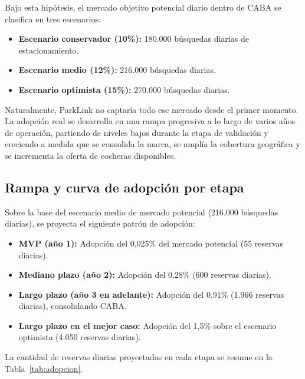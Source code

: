 Bajo esta hipótesis, el mercado objetivo potencial diario dentro de CABA se clasifica en tres escenarios:
\begin{itemize}
    \item \textbf{Escenario conservador (10\%):} 180.000 búsquedas diarias de estacionamiento.
    \item \textbf{Escenario medio (12\%):} 216.000 búsquedas diarias.
    \item \textbf{Escenario optimista (15\%):} 270.000 búsquedas diarias.
\end{itemize}

Naturalmente, ParkLink no captaría todo ese mercado desde el primer momento. La adopción real se desarrolla en una rampa progresiva a lo largo de varios años de operación, partiendo de niveles bajos durante la etapa de validación y creciendo a medida que se consolida la marca, se amplía la cobertura geográfica y se incrementa la oferta de cocheras disponibles.

\subsection{Rampa y curva de adopción por etapa}

Sobre la base del escenario medio de mercado potencial (216.000 búsquedas diarias), se proyecta el siguiente patrón de adopción:

\begin{itemize}
    \item \textbf{MVP (año 1):} Adopción del 0,025\% del mercado potencial (55 reservas diarias).
    \item \textbf{Mediano plazo (año 2):} Adopción del 0,28\% (600 reservas diarias).
    \item \textbf{Largo plazo (año 3 en adelante):} Adopción del 0,91\% (1.966 reservas diarias), consolidando CABA.
    \item \textbf{Largo plazo en el mejor caso:} Adopción del 1,5\% sobre el escenario optimista (4.050 reservas diarias).
\end{itemize}

La cantidad de reservas diarias proyectadas en cada etapa se resume en la Tabla~\ref{tab:adopcion}.

\begin{table}[H]
    \centering
    \caption{Reservas diarias proyectadas por etapa.}
    \vspace{0.2cm}
    \label{tab:adopcion}
\end{table}

